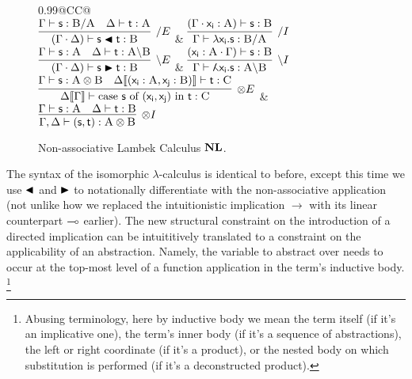 \begin{figure}
	\centering
	\begin{tabularx}{0.99\textwidth}{@{}CC@{}}
		\\[2em]
		$\infer[\divright E]{(\Gamma \sbind \Delta) \vdash \term{s}\nappright\term{t}: \prop B}{\Gamma \vdash \term{s}: \prop{B} \divright \prop{A} & \Delta \vdash \term{t}: \prop{A}}$
		& 
		$\infer[\divright I]{\Gamma \vdash \term{\lambda x_i.s}: \prop{B} \divright \prop{A}}{(\Gamma \sbind \term{x_i}: \prop A) \vdash \term{s}:\prop B}$\\[2em]
		$\infer[\divleft E]{(\Gamma \sbind \Delta) \vdash \term{s}\nappleft\term{t}:\prop B}{\Gamma \vdash \term{s}: \prop A & \Delta \vdash \term{t}: \prop{A}\divleft\prop{B}}$
		& 
		$\infer[\divleft I]{\Gamma \vdash \term{\adbmal x_i.s}: \prop A \divleft \prop B}{(\term{x_i}: \prop A \sbind \Gamma) \vdash  \term{s}:\prop B}$\\[2em]
		$\infer[\otimes E]{\Delta\ctx{\Gamma} \vdash \cterm{case \term{s} of \term{(x_i, x_j)} in \term{t}}: \prop C}{
			\Gamma \vdash \term{s}: \prop{A}\otimes\prop{B}
			&
			\Delta\ctx{(\term{x_i}: \prop A, \term{x_j}: \prop{B})}  \vdash \term{t}: \prop C}$
		&
		$\infer[\otimes I]{\Gamma,\Delta \vdash \term{(s,t)}: \prop A \otimes \prop B}{\Gamma \vdash \term{s}: \prop A & \Delta \vdash \term{t}: \prop B}$
	\end{tabularx}
	\caption{Non-associative Lambek Calculus $\textbf{NL}$.}
	\label{figure:non_assoc_lambek_rules}
\end{figure}

The syntax of the isomorphic $\lambda$-calculus is identical to before, except this time we use $\blacktriangleleft$ and $\blacktriangleright$ to notationally differentiate with the non-associative application (not unlike how we replaced the intuitionistic implication $\to$ with its linear counterpart $\li$ earlier).
The new structural constraint on the introduction of a directed implication can be intuititively translated to a constraint on the applicability of an abstraction.
Namely, the variable to abstract over needs to occur at the top-most level of a function application in the term's inductive body.%
\footnote{Abusing terminology, here by inductive body we mean the term itself (if it's an implicative one), the term's inner body (if it's a sequence of abstractions), the left or right coordinate (if it's a product), or the nested body on which substitution is performed (if it's a deconstructed product).}


